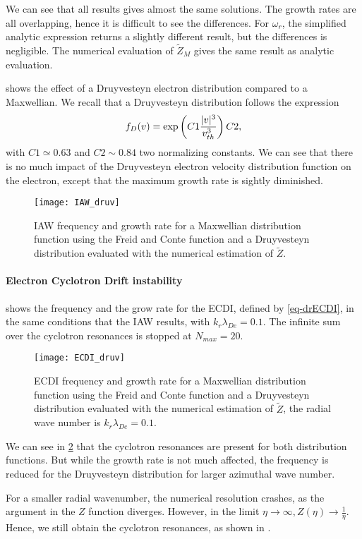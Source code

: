   We can see that all results gives almost the same solutions.
  The growth rates are all overlapping, hence it is difficult to see the differences.
  For $\omega_r$, the simplified analytic expression returns a slightly different result, but the differences is negligible.
  The numerical evaluation of $\tilde{Z}_M$ gives the same result as analytic evaluation.
  
   shows the effect of a Druyvesteyn electron distribution compared to a Maxwellian.
  We recall that a Druyvesteyn distribution follows the expression
  \begin{equation} \label{eq-druyv}
    f_{D}(v) = \exp \left( C1 \frac{\lvert v\rvert^3}{v_{th}^3}  \right) C2,
  \end{equation}
  with $C1 \simeq 0.63$ and $C2 \sim 0.84$ two normalizing constants.
  We can see that there is no much impact of the Druyvesteyn electron velocity distribution function on the electron, except that the maximum growth rate is sightly diminished.
  
  \begin{figure}[hbt]
    \centering
    \texttt{[image: IAW\_druv]}
    \caption{\ac{IAW} frequency and growth rate for a Maxwellian distribution function using the Freid and Conte function and a Druyvesteyn distribution evaluated with the numerical estimation of $\tilde{Z}$. }
    \label{fig-IAW_druv}
  \end{figure}
  
  \paragraph{Electron Cyclotron Drift instability\\}
  
     shows the frequency and the grow rate for the \ac{ECDI}, defined by \cref{eq-drECDI}, in the same conditions that the \ac{IAW} results, with $k_r \lambda_{De} = 0.1 $.
    The infinite sum over the cyclotron resonances is stopped at $N_{max} = 20$.
    
    
    \begin{figure}[hbt]
    \centering
    \texttt{[image: ECDI\_druv]}
    \caption{\ac{ECDI} frequency and growth rate for a Maxwellian distribution function using the Freid and Conte function and a Druyvesteyn distribution evaluated with the numerical estimation of $\tilde{Z}$, the radial wave number is $k_r \lambda_{De} = 0.1 $.}
    \label{fig-ECDI_druv}
  \end{figure}
  
  We can see in \cref{fig-ECDI_druv} that the cyclotron resonances are present for both distribution functions.
  But while the growth rate is not much affected, the frequency is reduced for the Druyvesteyn distribution for larger azimuthal wave number.
  
  For a smaller radial wavenumber, the numerical resolution crashes, as the argument in the $Z$ function diverges.
  However, in the limit $\eta \rightarrow \infty, Z(\eta) \rightarrow  \frac{1}{\eta}$.
  Hence, we still obtain the cyclotron resonances, as shown in \citet[Fig. 2]{janhunen2018}.
  
  
\let\rightmark=\oldrightmark
